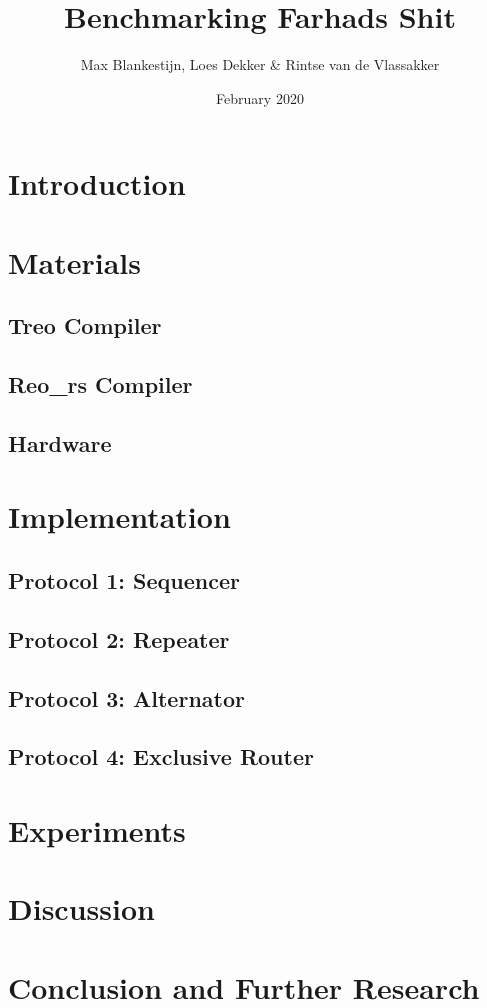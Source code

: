 \documentclass{article}
\title{Benchmarking Farhads Shit}
\author{Max Blankestijn, Loes Dekker \& Rintse van de Vlassakker}
\date{February 2020}
\begin{document}
\maketitle

\section{Introduction}

\section{Materials}
\subsection{Treo Compiler}
\subsection{Reo\_rs Compiler}
\subsection{Hardware}

\section{Implementation}
\subsection{Protocol 1: Sequencer}
\subsection{Protocol 2: Repeater}
\subsection{Protocol 3: Alternator}
\subsection{Protocol 4: Exclusive Router}

\section{Experiments}

\section{Discussion}

\section{Conclusion and Further Research}

\newpage



\end{document}
